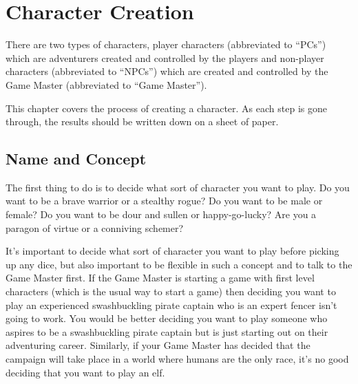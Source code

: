 \chapter[red]{Character Creation}
\label{chap:Character Creation}
\thispagestyle{plain}

\begin{multicols*}{2}
There are two types of characters, player characters (abbreviated to “PCs”) which are adventurers created and controlled by the players and non-player characters (abbreviated to “NPCs”) which are created and controlled by the Game Master (abbreviated to “Game Master”).

This chapter covers the process of creating a character. As each step is gone through, the results should be written down on a sheet of paper.

\section{Name and Concept}
The first thing to do is to decide what sort of character you want to play. Do you want to be a brave warrior or a stealthy rogue? Do you want to be male or female? Do you want to be dour and sullen or happy-go-lucky? Are you a paragon of virtue or a conniving schemer?

It’s important to decide what sort of character you want to play before picking up any dice, but also important to be flexible in such a concept and to talk to the Game Master first. If the Game Master is starting a game with first level characters (which is the usual way to start a game) then deciding you want to play an experienced swashbuckling pirate captain who is an expert fencer isn’t going to work. You would be better deciding you want to play someone who aspires to be a swashbuckling pirate captain but is just starting out on their adventuring career. Similarly, if your Game Master has decided that the campaign will take place in a world where humans are the only race, it’s no good deciding that you want to play an elf.



\end{multicols*}
